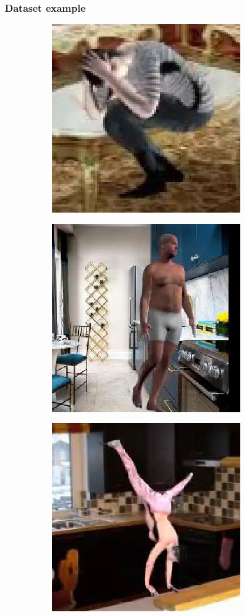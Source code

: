 \documentclass{beamer}
\begin{document}
\begin{frame}
\frametitle{Dataset example}

\begin{figure}
\centering
\begin{subfigure}{.3\textwidth}
  \centering
  \includegraphics[scale=0.25]{ung_77_09_c0001_67.jpg}
\end{subfigure}
\begin{subfigure}{.3\textwidth}
  \centering
  \includegraphics[scale=0.25]{ung_91_62_c0003_87.jpg}
\end{subfigure}
\begin{subfigure}{.3\textwidth}
  \centering
  \includegraphics[scale=0.25]{ung_144_02_c0006_2.jpg}

\end{subfigure}
\end{figure}
\end{frame}
\end{document}
